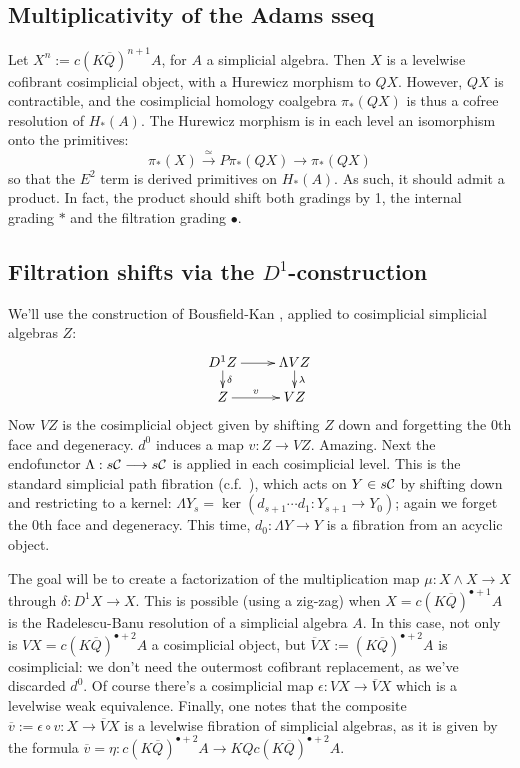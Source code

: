 \documentclass[10pt]{article}
\newcommand{\Comm}{\calC}
\begin{document}
\begin{Adams Muliplicativity}
\section{Multiplicativity of the Adams sseq}
Let $X^n:=c(K\overline{Q})^{n+1}A$, for $A$ a simplicial algebra. Then $X$ is a levelwise cofibrant cosimplicial object, with a Hurewicz morphism to $QX$. However, $QX$ is contractible, and the cosimplicial homology coalgebra $\pi_*(QX)$ is thus a cofree resolution of $H_*(A)$. The Hurewicz morphism is in each level an isomorphism onto the primitives:
\[\pi_*(X)\overset{\simeq}{\to}P\pi_*(QX)\overset{}{\to}\pi_*(QX)\]
so that the $E^2$ term is derived primitives on $H_*(A)$. As such, it should admit a product. In fact, the product should shift both gradings by 1, the internal grading $*$ and the filtration grading $\bullet$.

\subsection{Filtration shifts via the $D^1$-construction}
We'll use the construction of Bousfield-Kan \cite{BK_pairings_products.pdf,BK_pairings.pdf}, applied to cosimplicial simplicial algebras $Z$:
\[\xymatrix@R=4mm{
D^1Z\ar[r]
\ar[d]^-{\delta}
&%
\Lambda VZ\ar[d]^-{\lambda}
\\%
Z\ar[r]^-{v}
&%
VZ%
}\]
Now $VZ$ is the cosimplicial object given by shifting $Z$ down and forgetting the 0th face and degeneracy. $d^0$ induces a map $v:Z\to VZ$. Amazing. Next the endofunctor $\Lambda:s\Comm\to s\Comm$ is applied in each cosimplicial level. This is the standard simplicial path fibration (c.f.\ \cite[p.82]{BousKanSSeq.pdf}), which acts on $Y\in s\Comm$ by shifting down and restricting to a kernel: $\Lambda Y_s=\ker(d_{s+1}\cdots d_1:Y_{s+1}\to Y_0)$; again we forget the 0th face and degeneracy. This time, $d_0:\Lambda Y\to Y$ is a fibration from an acyclic object.

The goal will be to create a factorization of the multiplication map $\mu:X\wedge  X\to X$ through $\delta:D^1X\to X$. This is possible (using a zig-zag) when $X=c(K\overline{Q})^{\bullet+1}A$ is the Radelescu-Banu resolution of a simplicial algebra $A$. In this case, not only is $VX=c(K\overline{Q})^{\bullet+2}A$ a cosimplicial object, but $\overline{V}X:=(K\overline{Q})^{\bullet+2}A$ is cosimplicial: we don't need the outermost cofibrant replacement, as we've discarded $d^0$. Of course there's a cosimplicial map $\epsilon:VX\to \overline{V}X$ which is a levelwise weak equivalence. Finally, one notes that the composite $\overline{v}:=\epsilon\circ v:X\to \overline{V}X$ is a levelwise fibration of simplicial algebras, as it is given by the formula $\overline{v}=\eta:c(K\overline{Q})^{\bullet+2}A\to KQc(K\overline{Q})^{\bullet+2}A$. 


\end{Adams Muliplicativity}
\end{document}
